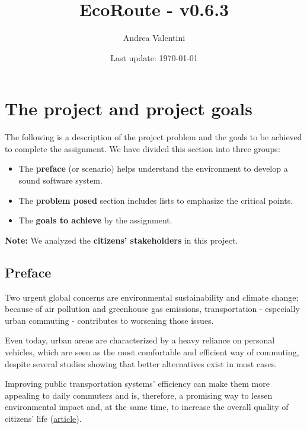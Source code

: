 \documentclass[a4paper]{article}
\newcommand{\highspace}{\vspace{1.2em}\noindent}
\begin{document}
    \author{Andrea Valentini}
    \title{EcoRoute - v0.6.3}
    \date{Last update: \today}
    \maketitle

    \newpage

    \tableofcontents

    \newpage

    \pagestyle{fancy}
    \fancyhead{} %
    \fancyhead[R]{\nouppercase{\leftmark\hfill\rightmark}}

    \section{The project and project goals}

    The following is a description of the project problem and the goals to be achieved to complete the assignment. We have divided this section into three groups:
    \begin{itemize}
        \item The \textbf{preface} (or scenario) helps understand the environment to develop a sound software system.

        \item The \textbf{problem posed} section includes lists to emphasize the critical points.

        \item The \textbf{goals to achieve} by the assignment.
    \end{itemize}
    \textbf{Note:} We analyzed the \textbf{citizens' stakeholders} in this project. 

    \subsection*{Preface}

    Two urgent global concerns are environmental sustainability and climate change; because of air pollution and greenhouse gas emissions, transportation - especially urban commuting - contributes to worsening those issues.

    \highspace
    Even today, urban areas are characterized by a heavy reliance on personal vehicles, which are seen as the most comfortable and efficient way of commuting, despite several studies showing that better alternatives exist in most cases.

    \highspace
    Improving public transportation systems' efficiency can make them more appealing to daily commuters and is, therefore, a promising way to lessen environmental impact and, at the same time, to increase the overall quality of citizens' life (\href{https://journals.plos.org/plosone/article?id=10.1371/journal.pone.0223650}{article}).
\end{document}
